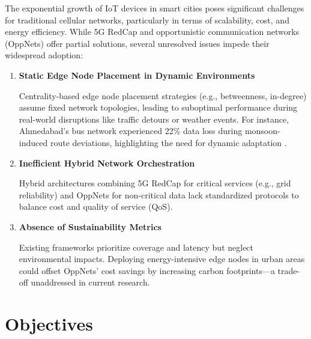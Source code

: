 \documentclass[12pt,a4paper]{report}
\begin{document}
The exponential growth of IoT devices in smart cities poses significant challenges
for traditional cellular networks, particularly in terms of scalability, cost, and
energy efficiency. While 5G RedCap and opportunistic communication networks
(OppNets) offer partial solutions, several unresolved issues impede their
widespread adoption:

\begin{enumerate}
	\item \textbf{Static Edge Node Placement in Dynamic Environments}
\par Centrality-based edge node placement strategies (e.g., betweenness, in-degree) assume
fixed network topologies, leading to suboptimal performance during real-world disruptions
like traffic detours or weather events. For instance, Ahmedabad's bus network experienced
22\% data loss during monsoon-induced route deviations, highlighting the need for
dynamic adaptation \cite{Gandhi_2023}.\\
	\item \textbf{Inefficient Hybrid Network Orchestration}
\par Hybrid architectures combining 5G RedCap for critical services (e.g., grid reliability)
and OppNets for non-critical data lack standardized protocols to balance cost and
quality of service (QoS).\\
	\item \textbf{Absence of Sustainability Metrics}
\par Existing frameworks prioritize coverage and latency but neglect environmental impacts.
Deploying energy-intensive edge nodes in urban areas could offset OppNets' cost savings
by increasing carbon footprints—a trade-off unaddressed in current research.\\
\end{enumerate}

\section{Objectives}
\end{document}
